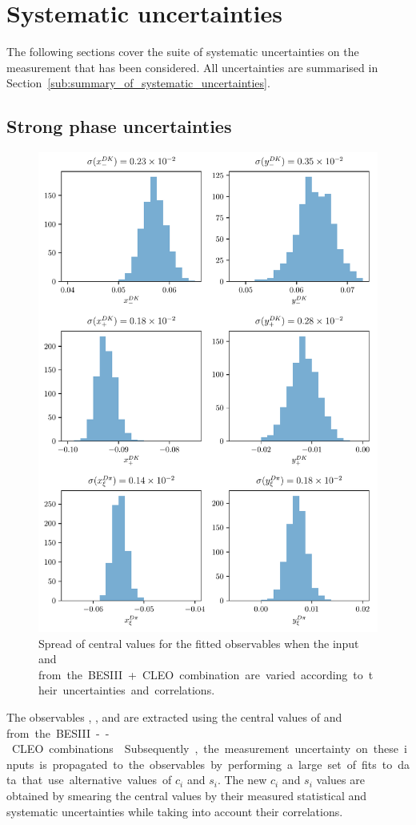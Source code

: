 \section{Systematic uncertainties} %
\label{sec:systematic_uncertainties}

The following sections cover the suite of systematic uncertainties on the measurement that has been considered. All uncertainties are summarised in Section~\ref{sub:summary_of_systematic_uncertainties}.

\subsection{Strong phase uncertainties} %
\label{sub:strong_phase_uncertainties}
\begin{figure}[tp]
    \centering
    \includegraphics[width=0.7\columnwidth]{figures/analysis/systematics/strong_phase_variation.pdf}
    \caption{Spread of central values for the fitted observables when the input \ci and \si from the BESIII+CLEO combination are varied according to their uncertainties and correlations. 
    }
    \label{fig:cisi_variation}
\end{figure}
The observables \xpmdk, \ypmdk, \xxidpi and \yxidpi are extracted using the central values of \ci and \si from the BESIII--CLEO combinations~\cite{CLEOCISI,BESCISI,BESCISIKSKK}. Subsequently, the measurement uncertainty on these inputs is propagated to the observables by performing a large set of fits to data that use alternative values of $c_i$ and $s_i$. The new $c_i$ and $s_i$ values are obtained by smearing the central values by their measured statistical and systematic uncertainties while taking into account their correlations. 

